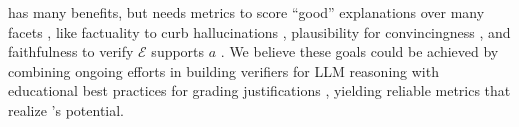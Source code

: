 \emcqa has many benefits, but needs metrics to score ``good'' explanations over many facets \cite{xu2023critical}, like factuality to curb hallucinations \cite{min2023factscore}, plausibility for convincingness \cite{liu2023vera}, and faithfulness to verify $\mathcal{E}$ supports $a$ \cite{lanham2023measuring}.
We believe these goals could be achieved by combining ongoing efforts in building verifiers for LLM reasoning \cite{NEURIPS2023_72393bd4} with educational best practices for grading justifications \cite{jonassen2010arguing}, yielding reliable metrics that realize \emcqa's potential.












